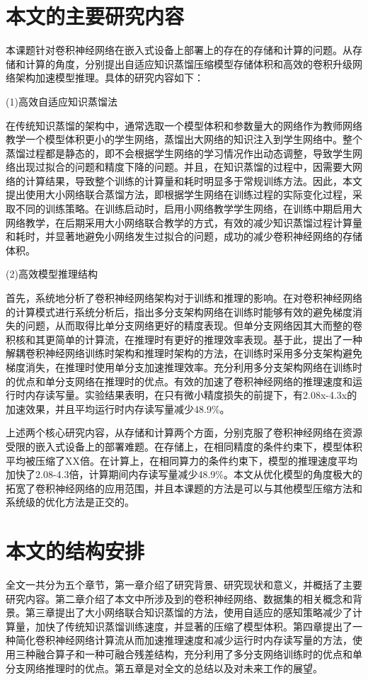 \section{本文的主要研究内容}

本课题针对卷积神经网络在嵌入式设备上部署上的存在的存储和计算的问题。从存储和计算的角度，分别提出自适应知识蒸馏压缩模型存储体积和高效的卷积升级网络架构加速模型推理。具体的研究内容如下：

(1)高效自适应知识蒸馏法

在传统知识蒸馏的架构中，通常选取一个模型体积和参数量大的网络作为教师网络教学一个模型体积更小的学生网络，蒸馏出大网络的知识注入到学生网络中。整个蒸馏过程都是静态的，即不会根据学生网络的学习情况作出动态调整，导致学生网络出现过拟合的问题和精度下降的问题。并且，在知识蒸馏的过程中，因需要大网络的计算结果，导致整个训练的计算量和耗时明显多于常规训练方法。因此，本文提出使用大小网络联合蒸馏方法，即根据学生网络在训练过程的实际变化过程，采取不同的训练策略。在训练启动时，启用小网络教学学生网络，在训练中期启用大网络教学，在后期采用大小网络联合教学的方式，有效的减少知识蒸馏过程计算量和耗时，并显著地避免小网络发生过拟合的问题，成功的减少卷积神经网络的存储体积。

(2)高效模型推理结构

首先，系统地分析了卷积神经网络架构对于训练和推理的影响。在对卷积神经网络的计算模式进行系统分析后，指出多分支架构网络在训练时能够有效的避免梯度消失的问题，从而取得比单分支网络更好的精度表现。但单分支网络因其大而整的卷积核和其更简单的计算流，在推理时有更好的推理效率表现。基于此，提出了一种解耦卷积神经网络训练时架构和推理时架构的方法，在训练时采用多分支架构避免梯度消失，在推理时使用单分支加速推理效率。充分利用多分支架构网络在训练时的优点和单分支网络在推理时的优点。有效的加速了卷积神经网络的推理速度和运行时内存读写量。实验结果表明，在只有微小精度损失的前提下，有2.08x-4.3x的加速效果，并且平均运行时内存读写量减少48.9\%。

上述两个核心研究内容，从存储和计算两个方面，分别克服了卷积神经网络在资源受限的嵌入式设备上的部署难题。在存储上，在相同精度的条件约束下，模型体积平均被压缩了XX倍。在计算上，在相同算力的条件约束下，模型的推理速度平均加快了2.08-4.3倍，计算期间内存读写量减少48.9\%。本文从优化模型的角度极大的拓宽了卷积神经网络的应用范围，并且本课题的方法是可以与其他模型压缩方法和系统级的优化方法是正交的。

\section{本文的结构安排}
全文一共分为五个章节，第一章介绍了研究背景、研究现状和意义，并概括了主要研究内容。第二章介绍了本文中所涉及到的卷积神经网络、数据集的相关概念和背景。第三章提出了大小网络联合知识蒸馏的方法，使用自适应的感知策略减少了计算量，加快了传统知识蒸馏训练速度，并显著的压缩了模型体积。第四章提出了一种简化卷积神经网络计算流从而加速推理速度和减少运行时内存读写量的方法，使用三种融合算子和一种可融合残差结构，充分利用了多分支网络训练时的优点和单分支网络推理时的优点。第五章是对全文的总结以及对未来工作的展望。


